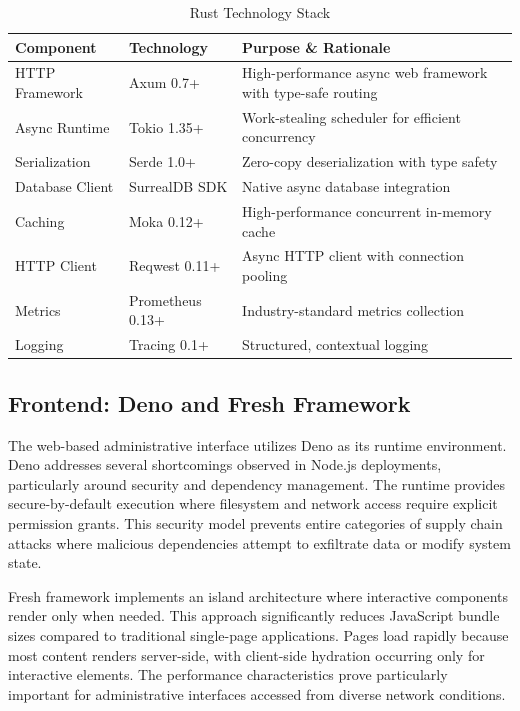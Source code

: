 \documentclass[12pt,a4paper,twoside]{report}
\begin{document}
\begin{table}[h]
\centering
\begin{tabular}{@{}p{4cm}p{3cm}p{5cm}@{}}
\toprule
\textbf{Component} & \textbf{Technology} & \textbf{Purpose \& Rationale} \\
\midrule
HTTP Framework & Axum 0.7+ & High-performance async web framework with type-safe routing \\
Async Runtime & Tokio 1.35+ & Work-stealing scheduler for efficient concurrency \\
Serialization & Serde 1.0+ & Zero-copy deserialization with type safety \\
Database Client & SurrealDB SDK & Native async database integration \\
Caching & Moka 0.12+ & High-performance concurrent in-memory cache \\
HTTP Client & Reqwest 0.11+ & Async HTTP client with connection pooling \\
Metrics & Prometheus 0.13+ & Industry-standard metrics collection \\
Logging & Tracing 0.1+ & Structured, contextual logging \\
\bottomrule
\end{tabular}
\caption{Rust Technology Stack}
\label{tab:rust-stack}
\end{table}

\subsection{Frontend: Deno and Fresh Framework}

The web-based administrative interface utilizes Deno as its runtime environment. Deno addresses several shortcomings observed in Node.js deployments, particularly around security and dependency management. The runtime provides secure-by-default execution where filesystem and network access require explicit permission grants. This security model prevents entire categories of supply chain attacks where malicious dependencies attempt to exfiltrate data or modify system state.

Fresh framework implements an island architecture where interactive components render only when needed. This approach significantly reduces JavaScript bundle sizes compared to traditional single-page applications. Pages load rapidly because most content renders server-side, with client-side hydration occurring only for interactive elements. The performance characteristics prove particularly important for administrative interfaces accessed from diverse network conditions.
\end{document}
